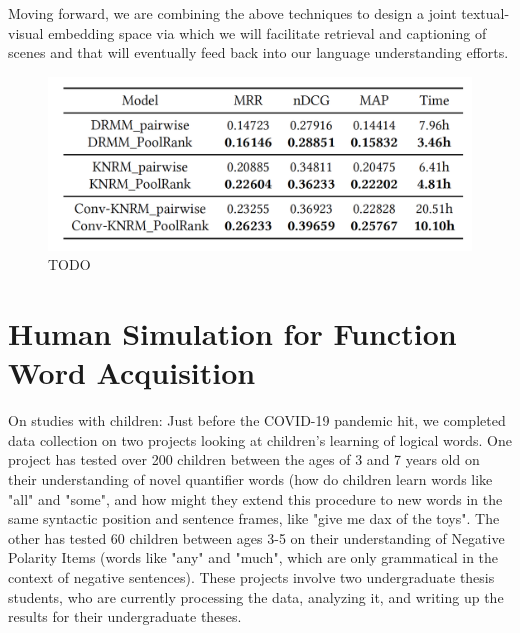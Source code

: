 \documentclass[11pt]{article}
\begin{document}
Moving forward, we are combining the above techniques to design a joint textual-visual embedding space via which we will facilitate retrieval and captioning of scenes and that will eventually feed back into our language understanding efforts. 

\begin{figure}[ht!]
\includegraphics[width=\linewidth]{figures/ir-table}
\caption{TODO}
\end{figure}


\section{Human Simulation for Function Word Acquisition} 
\label{sec:hsr}

On studies with children: Just before the COVID-19 pandemic hit, we completed data collection on two projects looking at children's learning of logical words. One project has tested over 200 children between the ages of 3 and 7 years old on their understanding of novel quantifier words (how do children learn words like "all" and "some", and how might they extend this procedure to new words in the same syntactic position and sentence frames, like "give me dax of the toys". The other has tested 60 children between ages 3-5 on their understanding of Negative Polarity Items (words like "any" and "much", which are only grammatical in the context of negative sentences). These projects involve two undergraduate thesis students, who are currently processing the data, analyzing it, and writing up the results for their undergraduate theses.
\end{document}
